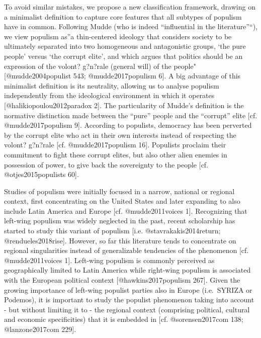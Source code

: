 \documentclass[]{article}
\begin{document}
To avoid similar mistakes, we propose a new classification framework,
drawing on a minimalist definition to capture core features that all
subtypes of populism have in common. Following Mudde (who is indeed
``influential in the literature''``), we view populism as''a
thin-centered ideology that considers society to be ultimately separated
into two homogeneous and antagonistic groups, `the pure people' versus
`the corrupt elite', and which argues that politics should be an
expression of the volont? g?n?rale (general will) of the people"
{[}@mudde2004populist 543; @mudde2017populism 6{]}. A big advantage of
this minimalist definition is its neutrality, allowing us to analyse
populism independently from the ideological environment in which it
operates {[}@halikiopoulou2012paradox 2{]}. The particularity of Mudde's
definition is the normative distinction made between the ``pure'' people
and the ``corrupt'' elite {[}cf. @mudde2017populism 9{]}. According to
populists, democracy has been perverted by the corrupt elite who act in
their own interests instead of respecting the volont? g?n?rale {[}cf.
@mudde2017populism 16{]}. Populists proclaim their commitment to fight
these corrupt elites, but also other alien enemies in possession of
power, to give back the sovereignty to the people {[}cf.
@otjes2015populists 60{]}.

Studies of populism were initially focused in a narrow, national or
regional context, first concentrating on the United States and later
expanding to also include Latin America and Europe {[}cf.
@mudde2011voices 1{]}. Recognizing that left-wing populism was widely
neglected in the past, recent scholarship has started to study this
variant of populism {[}i.e. @stavrakakis2014return;
@rendueles2018rise{]}. However, so far this literature tends to
concentrate on regional singularities instead of generalizable
tendencies of the phenomenon {[}cf. @mudde2011voices 1{]}. Left-wing
populism is commonly perceived as geographically limited to Latin
America while right-wing populism is associated with the European
political context {[}@hawkins2017populism 267{]}. Given the growing
importance of left-wing populist parties also in Europe (i.e.~SYRIZA or
Podemos), it is important to study the populist phenomenon taking into
account - but without limiting it to - the regional context (comprising
political, cultural and economic specificities) that it is embedded in
{[}cf. @sorensen2017com 138; @lanzone2017com 229{]}.
\end{document}
